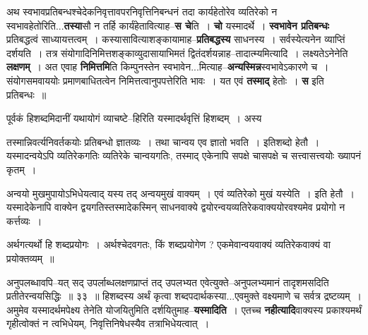 \documentclass[article,12pt,a4paper]{memoir}
\begin{document}
	  \endgroup
	

	  \pstart अथ स्वभावप्रतिबन्धश्चेदेकनिवृत्तावपरनिवृत्तिनिबन्धनं तदा कार्यहेतोरेव व्यतिरेको न स्वभावहेतो\leavevmode{}रिति...\textbf{तस्या}सौ न तर्हि कार्यंहेतावित्याह--\textbf{स चे}ति । \textbf{चो} यस्मादर्थे । \textbf{स्वभावेन प्रतिबन्धः} प्रतिबद्धत्वं साध्यायत्तत्वम् । कस्यासावित्याशङ्कायामाह--\textbf{प्रतिबद्धस्य} साधनस्य । सर्वस्येत्यनेन व्याप्तिं दर्शयति । तत्र संयोगादिनिमित्तशङ्काव्युदासायाभिमतं द्वितंदर्शयन्नाह--तादात्म्यमित्यादि । लक्ष्यतेऽनेनेति \textbf{लक्षणम्} । अत एवाह \textbf{निमित्तमि}ति किम्पुनस्तेन स्वभावेन...मित्याह--\textbf{अन्यस्मिन्न}स्वभावेऽकारणे च । संयोगसमवाययोः प्रमाणबाधितत्वेन निमित्तत्वानुपपत्तेरिति भावः । यत एवं \textbf{तस्माद्} हेतोः । \textbf{स} इति प्रतिबन्धः ॥
	\pend
      

	  \pstart पूर्वकं हिशब्दमिदानीं यथायोगं व्याचष्टे--हिरिति यस्मादर्थवृत्तिं हिशब्दम् । अस्य  \leavevmode{} 
	  
	तस्मान्निवर्त्यनिवर्तकयोः प्रतिबन्धो ज्ञातव्यः । तथा चान्वय एव ज्ञातो भवति । इतिशब्दो हेतौ । यस्मादन्वयेऽपि व्यतिरेकगतिः व्यतिरेके चान्वयगतिः, तस्माद् एकेनापि सपक्षे चासपक्षे च सत्त्वासत्त्वयोः ख्यापनं कृतम् ।  
	  
	अन्वयो मुखमुपायोऽभिधेयत्वाद् यस्य तद् अन्वयमुखं वाक्यम् । एवं व्यतिरेको मुखं यस्येति । इति हेतौ । यस्मादेकेनापि वाक्येन द्वयगतिस्तस्मादेकस्मिन् साधनवाक्ये द्वयोरन्वयव्यतिरेकवाक्ययोरवश्यमेव प्रयोगो न कर्त्तव्यः ।  
	  
	अर्थगत्यर्थो हि शब्दप्रयोगः । अर्थश्चेदवगतः, किं शब्दप्रयोगेण ? एकमेवान्वयवाक्यं व्यतिरेकवाक्यं वा प्रयोक्तव्यम् ॥ 
	  
	अनुपलब्धावपि--यत् सद् उपर्लाब्धलक्षणप्राप्तं तद् उपलभ्यत एवेत्युक्ते--अनुपलभ्यमानं तादृशमसदिति प्रतीतेरन्वयसिद्धिः ॥ ३३ ॥ हिशब्दस्य अर्थं कृत्वा शब्दपदार्थकस्या...एवमुक्ते वक्ष्यमाणे च सर्वत्र द्रष्टव्यम् । अमुमेव यस्मादर्थमपेक्ष्य तेनेति योजयितुमिति दर्शयितुमाह--\textbf{यस्मादिति} । एतच्च \textbf{नहीत्यादि}वाक्यस्य प्रकाश्यमर्थं गृहीत्वोक्तं न त्वभिधेयम्, निवृत्तिनिषेधस्यैव तत्राभिधेयत्वात् ।
	\pend
      
\end{document}
